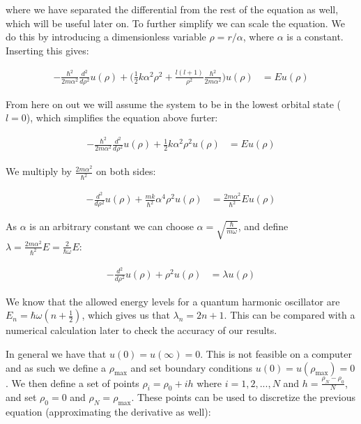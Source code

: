 \documentclass[reprint,english,notitlepage]{revtex4-1}  %
\begin{document}
where we have separated the differential from the rest of the equation as well, which will be useful later on. To further simplify we can scale the equation. We do this by introducing a dimensionless variable $\rho = r/\alpha$, where $\alpha$ is a constant. Inserting this gives:

\begin{align*}
-\frac{\hbar^2}{2m\alpha^2} \frac{d^2}{d\rho^2} u(\rho) + \bigg( \frac{1}{2}k\alpha^2 \rho^2 + \frac{l(l+1)}{\rho^2} \frac{\hbar^2}{2m\alpha^2} \bigg) u(\rho) &= Eu(\rho)
\end{align*}

From here on out we will assume the system to be in the lowest orbital state ($l=0$), which simplifies the equation above furter:

\begin{align*}
-\frac{\hbar^2}{2m\alpha^2} \frac{d^2}{d\rho^2} u(\rho) + \frac{1}{2}k\alpha^2 \rho^2 u(\rho) &= Eu(\rho)
\end{align*}

We multiply by $\frac{2m\alpha^2}{\hbar^2}$ on both sides:

\begin{align*}
-\frac{d^2}{d\rho^2} u(\rho) + \frac{mk}{\hbar^2}\alpha^4 \rho^2 u(\rho) &= \frac{2m\alpha^2}{\hbar^2} Eu(\rho)
\end{align*}

As $\alpha$ is an arbitrary constant we can choose $\alpha = \sqrt{\frac{\hbar}{m \omega}}$, and define $\lambda = \frac{2m\alpha^2}{\hbar^2} E = \frac{2}{\hbar \omega} E$:

\begin{align*}
-\frac{d^2}{d\rho^2} u(\rho) + \rho^2 u(\rho) &= \lambda u(\rho)
\end{align*}

We know that the allowed energy levels for a quantum harmonic oscillator are $E_n = \hbar \omega (n + \frac{1}{2})$, which gives us that $\lambda_n = 2n+1$. This can be compared with a numerical calculation later to check the accuracy of our results.

In general we have that $u(0) = u(\infty) = 0$. This is not feasible on a computer and as such we define a $\rho_{\text{max}}$ and set boundary conditions $u(0) = u(\rho_{\text{max}}) = 0$. We then define a set of points $\rho_i = \rho_0 + ih$ where $i = 1,2,...,N$ and $h = \frac{\rho_N - \rho_0}{N}$, and set $\rho_0 = 0$ and $\rho_N  = \rho_{\text{max}}$. These points can be used to discretize the previous equation (approximating the derivative as well):
\end{document}
